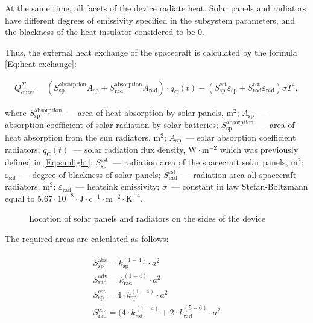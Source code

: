 \documentclass[12pt,a4paper]{article}
\begin{document}
At the same time, all facets of the device radiate heat. Solar panels and radiators have different degrees of emissivity specified in the subsystem parameters, and the blackness of the heat insulator
considered to be 0.

Thus, the external heat exchange of the spacecraft is calculated by the formula \ref{Eq:heat-exchange}:

\begin{eqnarray}
  Q^{\Sigma}_{\text{outer}} = \left(S_{\text{sp}}^{\text{absorption}} A_{\text{sp}} +
  S_{\text{rad}}^{\text{absorption}} A_{\text{rad}}\right) \cdot q_{\text{C}}(t) -
  \left(S_{\text{sp}}^{\text{est}} \varepsilon_{\text{sp}} + S_{\text{rad}}^{\text{est}}
  \varepsilon_{\text{rad}}\right)
  \sigma T^4, \label{Eq:heat-exchange}
\end{eqnarray}

where $S_{\text{sp}}^{\text{absorption}}$~--- area of heat absorption by solar panels,
$\text{m}^2$; $A_{\text{sp}}$~--– absorption coefficient of solar radiation by solar
batteries; $S_{\text{sp}}^{\text{absorption}}$~--– area of heat absorption from the sun
radiators, $\text{m}^2$; $A_{\text{sp}}$~--– solar absorption coefficient
radiators; $q_{\text{С}}(t)$~--– solar radiation flux density, $\text{W} \cdot
\text{m}^{-2}$ which was previously defined in \ref{Eq:sunlight};
$S_{\text{sp}}^{\text{est}}$~--- radiation area of the spacecraft solar panels, $\text{m}^2$; $\varepsilon_{\text{sat}}$~--–
degree of blackness of solar panels; $S_{\text{rad}}^{\text{est}}$~--– radiation area
all spacecraft radiators, $\text{m}^2$; $\varepsilon_{\text{rad}}$~--– heatsink emissivity; $\sigma$~--- constant in law
Stefan-Boltzmann equal to $5.67 \cdot 10^{-8} \cdot \text{J} \cdot \text{c}^{-1} \cdot
\text{m}^{-2} \cdot \text{K}^{-4}$.

\begin{figure}[tbh]
   \begin{center}
     \caption{Location of solar panels and radiators on the sides of the device}
     \label{Pic:surfaces}
   \end{center}
\end{figure}

The required areas are calculated as follows:

\begin{eqnarray}
   \begin{array}{l}
   S_{\text{sp}}^{\text{abs}} = k^{(1-4)}_{\text{sp}} \cdot a^2 \\
   S_{\text{rad}}^{\text{adv}} = k^{(1-4)}_{\text{rad}} \cdot a^2 \\
   S_{\text{sp}}^{\text{est}} = 4 \cdot k^{(1-4)}_{\text{sp}} \cdot a^2 \\
   S_{\text{rad}}^{\text{est}} = (4 \cdot k^{(1-4)}_{\text{est}} + 2 \cdot
   k^{(5-6)}_{\text{rad}} \cdot a^2
   \end{array}
\end{eqnarray}
\end{document}
